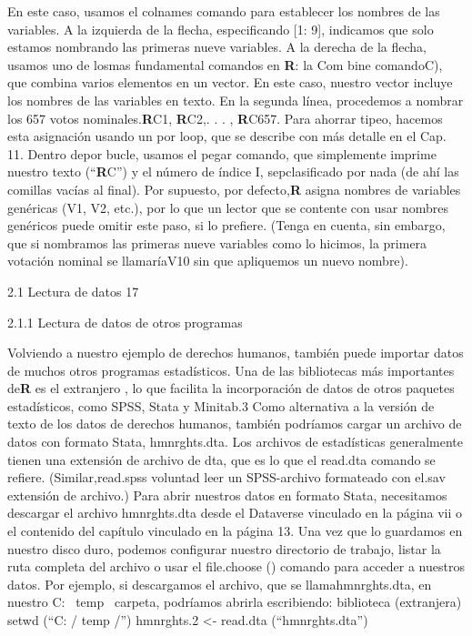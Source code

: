 \documentclass[
]{book}
\begin{document}
En este caso, usamos el colnames comando para establecer los nombres de las variables. A la izquierda de la flecha, especificando {[}1: 9{]}, indicamos que solo estamos nombrando las primeras nueve variables. A la derecha de la flecha, usamos uno de losmas fundamental comandos en \textbf{R}: la Com bine comandoC), que combina varios elementos en un vector. En este caso, nuestro vector incluye los nombres de las variables en texto. En la segunda línea, procedemos a nombrar los 657 votos nominales.\textbf{R}C1, \textbf{R}C2,. . . , \textbf{R}C657.
Para ahorrar tipeo, hacemos esta asignación usando un por loop, que se describe con más detalle en el Cap. 11. Dentro depor bucle, usamos el pegar comando, que simplemente imprime nuestro texto (``\textbf{R}C'') y el número de índice I, sepclasificado por nada (de ahí las comillas vacías al final). Por supuesto, por defecto,\textbf{R} asigna nombres de variables genéricas (V1, V2, etc.), por lo que un lector que se contente con usar nombres genéricos puede omitir este paso, si lo prefiere. (Tenga en cuenta, sin embargo, que si nombramos las primeras nueve variables como lo hicimos, la primera votación nominal se llamaríaV10 sin que apliquemos un nuevo nombre).

2.1 Lectura de datos 17

2.1.1 Lectura de datos de otros programas

Volviendo a nuestro ejemplo de derechos humanos, también puede importar datos de muchos otros programas estadísticos. Una de las bibliotecas más importantes de\textbf{R} es el extranjero
, lo que facilita la incorporación de datos de otros paquetes estadísticos, como SPSS, Stata y
Minitab.3 Como alternativa a la versión de texto de los datos de derechos humanos, también podríamos cargar un archivo de datos con formato Stata, hmnrghts.dta.
Los archivos de estadísticas generalmente tienen una extensión de archivo de dta, que es lo que el read.dta comando se refiere. (Similar,read.spss voluntad leer un SPSS-archivo formateado con el.sav extensión de archivo.) Para abrir nuestros datos en formato Stata, necesitamos descargar el archivo hmnrghts.dta desde el Dataverse vinculado en la página vii o el contenido del capítulo vinculado en la página 13. Una vez que lo guardamos en nuestro disco duro, podemos configurar nuestro directorio de trabajo, listar la ruta completa del archivo o usar el file.choose () comando para acceder a nuestros datos. Por ejemplo, si descargamos el archivo, que se llamahmnrghts.dta,
en nuestro C: ~temp ~carpeta, podríamos abrirla escribiendo:
biblioteca (extranjera) setwd (``C: / temp /'')
hmnrghts.2 \textless- read.dta (``hmnrghts.dta'')
\end{document}
